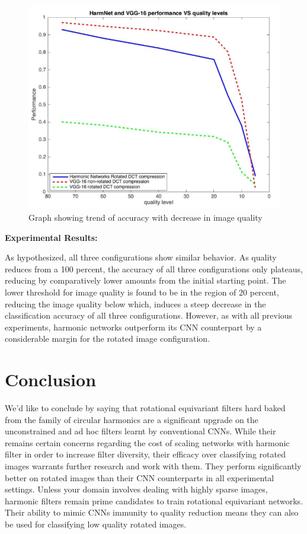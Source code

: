 \documentclass{article}
\begin{document}
\begin{figure}[t!]
  \includegraphics[width=\linewidth]{vggAndHarmVsquality.png}
  \caption{Graph showing trend of accuracy with decrease in image quality}
  \label{fig:SparseGraph}
\end{figure}

\textbf{Experimental Results:}

As hypothesized, all three configurations show similar behavior. As quality reduces from a 100 percent, the accuracy of all three configurations only plateaus, reducing by comparatively lower amounts from the initial starting point. The lower threshold for image quality is found to be in the region of 20 percent, reducing the image quality below which, induces a steep decrease in the classification accuracy of all three configurations. However, as with all previous experiments, harmonic networks outperform its CNN counterpart by a considerable margin for the rotated image configuration.


\section{Conclusion}

We’d like to conclude by saying that rotational equivariant filters hard baked from the family of circular harmonics are a significant upgrade on the unconstrained and ad hoc filters learnt by conventional CNNs. While their remains certain concerns regarding the cost of scaling networks with harmonic filter in order to increase filter diversity, their efficacy over classifying rotated images warrants further research and work with them. They perform significantly better on rotated images than their CNN counterparts in all experimental settings. Unless your domain involves dealing with highly sparse images, harmonic filters remain prime candidates to train rotational equivariant networks. Their ability to mimic CNNs immunity to quality reduction means they can also be used for classifying low quality rotated images.
\end{document}
